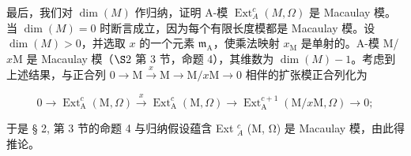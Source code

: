 最后，我们对 \(\dim(M)\) 作归纳，证明 A-模 \(\operatorname{Ext}_{A}^{c}(M,\Omega)\) 是 Macaulay 模。当 \(\dim(M)=0\) 时断言成立，因为每个有限长度模都是 Macaulay 模。设 \(\dim(M)>0\)，并选取 \(x\) 的一个元素 \(\mathfrak{m}_{\mathrm{A}}\)，使乘法映射 \(x_{\mathrm{M}}\) 是单射的。A-模 M/\(x\mathrm{M}\) 是 Macaulay 模（\(\S 2\) 第 3 节，命题 4），其维数为 \(\dim(M)-1\)。考虑到上述结果，与正合列 \(0\to\mathrm{M}\xrightarrow{x}\mathrm{M}\longrightarrow\mathrm{M}/x\mathrm{M}\to0\) 相伴的扩张模正合列化为

\[
0 \to \operatorname{Ext} _ {\mathrm{A}} ^ {c} (\mathrm{M}, \Omega) \xrightarrow {x} \operatorname{Ext} _ {\mathrm{A}} ^ {c} (\mathrm{M}, \Omega) \longrightarrow \operatorname{Ext} _ {\mathrm{A}} ^ {c + 1} (\mathrm{M} / x \mathrm{M}, \Omega) \to 0;
\]

于是 § 2, 第 3 节的命题 4 与归纳假设蕴含 Ext \(_{A}^{c}\) (M, Ω) 是 Macaulay 模，由此得推论。

